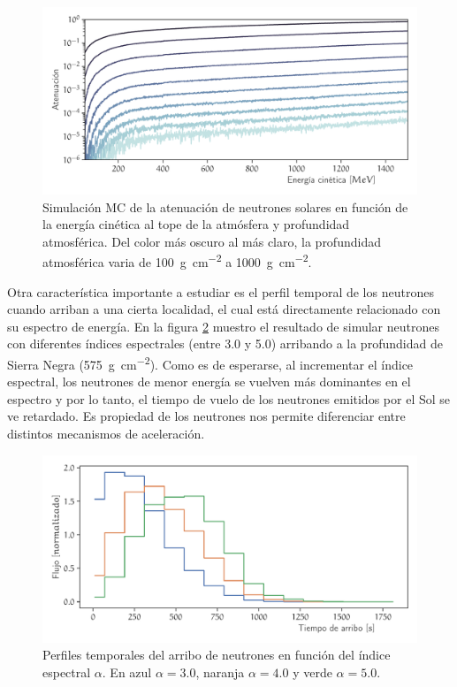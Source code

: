 \begin{figure}
        \centering
        \includegraphics[width=\textwidth]{neutron-at.pdf}
        \caption{Simulación MC de la atenuación de neutrones solares en función de la energía cinética al tope de la atmósfera y profundidad atmosférica. Del color más oscuro al más claro, la profundidad atmosférica varia de \SI{100}{\gram\per\square\cm} a \SI{1000}{\gram\per\square\cm}.}
        \label{fig:neutron-at}
\end{figure}

Otra característica importante a estudiar es el perfil temporal de los neutrones cuando arriban a una cierta localidad, el cual está directamente relacionado con su espectro de energía. En la figura \ref{fig:neutron-time} muestro el resultado de simular neutrones con diferentes índices espectrales (entre \num{3.0} y \num{5.0}) arribando a la profundidad de Sierra Negra (\SI{575}{\gram\per\square\cm}). Como es de esperarse, al incrementar el índice espectral, los neutrones de menor energía se vuelven más dominantes en el espectro y por lo tanto, el tiempo de vuelo de los neutrones emitidos por el Sol se ve retardado. Es propiedad de los neutrones nos permite diferenciar entre distintos mecanismos de aceleración.

\begin{figure}
        \centering
        \includegraphics[width=\textwidth]{neutron-time.pdf}
        \caption{Perfiles temporales del arribo de neutrones en función del índice espectral $\alpha$. En azul $\alpha=3.0$, naranja $\alpha=4.0$ y verde $\alpha=5.0$.}
        \label{fig:neutron-time}
\end{figure}


